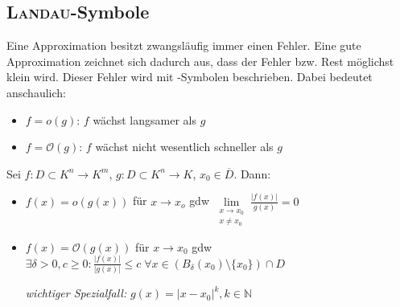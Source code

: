 \subsection{\textsc{Landau}-Symbole}

\begin{*anmerkung}
	Eine Approximation besitzt zwangsläufig immer einen Fehler. Eine gute Approximation zeichnet sich dadurch aus, dass der Fehler bzw. Rest möglichst klein wird. Dieser Fehler wird mit -Symbolen beschrieben. Dabei bedeutet anschaulich:
	\begin{itemize}
		\item $f=o(g)$: $f$ wächst langsamer als $g$
		\item $f=\mathcal{O}(g)$: $f$ wächst nicht wesentlich schneller als $g$
	\end{itemize}
\end{*anmerkung}

Sei $f:D\subset K^n \to K^m$, $g:D\subset K^n \to K$, $x_0 \in \overline{D}$. Dann:
\begin{itemize}
	\item $f(x) = o(g(x))$ für $x\to x_o$ \gls{gdw} $\lim\limits_{\substack{x\to x_0 \\ x\neq x_0}} \frac{\vert f(x) \vert}{g(x)} = 0$
	\item $f(x) = \mathcal{O}(g(x))$ für $x\to x_0$ \gls{gdw} $\exists \delta > 0, c \ge 0: \frac{\vert f(x) \vert}{\vert g(x) \vert} \le c \;\forall x\in \left( B_\delta(x_0)\setminus \{ x_0\}\right) \cap D$
	
	\emph{wichtiger Spezialfall:} $g(x) = \vert x - x_0\vert ^k, k\in\mathbb{N}$
\end{itemize}


